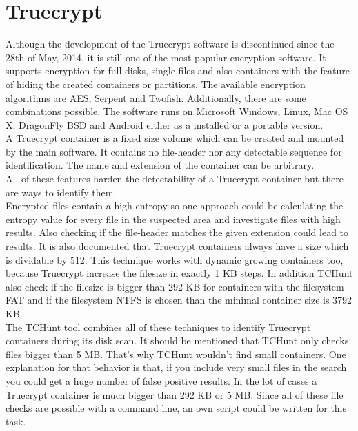 \section{Truecrypt}
Although the development of the Truecrypt software is discontinued since the 28th of May, 2014, it is still one of the most popular encryption software.
It supports encryption for full disks, single files and also containers with the feature of hiding the created containers or partitions.
The available encryption algorithms are AES, Serpent and Twofish. Additionally, there are some combinations possible.
The software runs on Microsoft Windows, Linux, Mac OS X, DragonFly BSD and Android either as a installed or a portable version.\cite{wiki:truecrypt}
\\
A Truecrypt container is a fixed size volume which can be created and mounted by the main software.
It contains no file-header nor any detectable sequence for identification.
The name and extension of the container can be arbitrary.\\
All of these features harden the detectability of a Truecrypt container but there are ways to identify them.
\\
Encrypted files contain a high entropy so one approach could be calculating the entropy value for every file in the suspected area and investigate files with high results.
Also checking if the file-header matches the given extension could lead to results.
It is also documented that Truecrypt containers always have a size which is dividable by 512.
This technique works with dynamic growing containers too, because Truecrypt increase the filesize in exactly 1 KB steps. In addition TCHunt also check if the filesize is bigger than 292 KB for containers with the filesystem FAT and if the filesystem NTFS is chosen than the minimal container size is 3792 KB.
\cite{truecrypt:sourceCode}
\\
The TCHunt tool combines all of these techniques to identify Truecrypt containers during its disk scan. It should be mentioned that TCHunt only checks files bigger than 5 MB.
That's why TCHunt wouldn't find small containers. One explanation for that behavior is that, if you include very small files in the search you could get a huge number of false positive results. In the lot of cases a Truecrypt container is much bigger than 292 KB or 5 MB. 
Since all of these file checks are possible with a command line, an own script could be written for this task.
